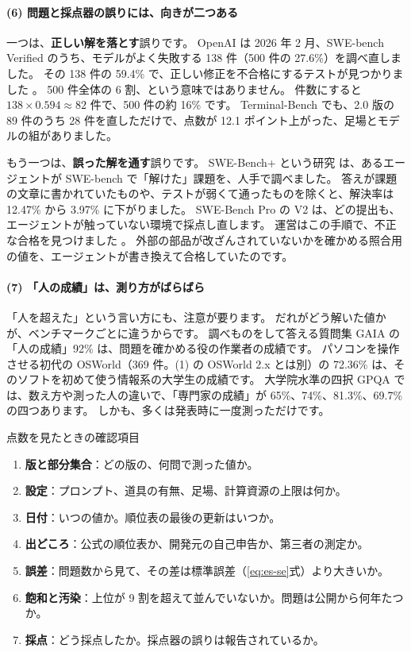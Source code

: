 \paragraph{(6) 問題と採点器の誤りには、向きが二つある}
一つは、\textbf{正しい解を落とす}誤りです。
OpenAI は 2026 年 2 月、SWE-bench Verified のうち、モデルがよく失敗する 138 件（500 件の 27.6\%）を調べ直しました。
その 138 件の 59.4\% で、正しい修正を不合格にするテストが見つかりました \cite{openai2026sweverified}。
500 件全体の 6 割、という意味ではありません。
件数にすると $138 \times 0.594 \approx 82$ 件で、500 件の約 16\% です。
Terminal-Bench でも、2.0 版の 89 件のうち 28 件を直しただけで、点数が 12.1 ポイント上がった、足場とモデルの組がありました。

もう一つは、\textbf{誤った解を通す}誤りです。
SWE-Bench+ という研究 \cite{aleithan2024swebenchplus} は、あるエージェントが SWE-bench で「解けた」課題を、人手で調べました。
答えが課題の文章に書かれていたものや、テストが弱くて通ったものを除くと、解決率は 12.47\% から 3.97\% に下がりました。
SWE-Bench Pro の V2 は、どの提出も、エージェントが触っていない環境で採点し直します。
運営はこの手順で、不正な合格を見つけました \cite{scale2026sweprov2}。
外部の部品が改ざんされていないかを確かめる照合用の値を、エージェントが書き換えて合格していたのです。

\paragraph{(7) 「人の成績」は、測り方がばらばら}
「人を超えた」という言い方にも、注意が要ります。
だれがどう解いた値かが、ベンチマークごとに違うからです。
調べものをして答える質問集 GAIA の「人の成績」92\% は、問題を確かめる役の作業者の成績です。
パソコンを操作させる初代の OSWorld（369 件。(1) の OSWorld 2.x とは別）の 72.36\% は、そのソフトを初めて使う情報系の大学生の成績です。
大学院水準の四択 GPQA では、数え方や測った人の違いで、「専門家の成績」が 65\%、74\%、81.3\%、69.7\% の四つあります。
しかも、多くは発表時に一度測っただけです。

\begin{practice}{点数を見たときの確認項目}
\begin{enumerate}[leftmargin=*,nosep]
  \item \textbf{版と部分集合}：どの版の、何問で測った値か。
  \item \textbf{設定}：プロンプト、道具の有無、足場、計算資源の上限は何か。
  \item \textbf{日付}：いつの値か。順位表の最後の更新はいつか。
  \item \textbf{出どころ}：公式の順位表か、開発元の自己申告か、第三者の測定か。
  \item \textbf{誤差}：問題数から見て、その差は標準誤差（\eqref{eq:es-se}式）より大きいか。
  \item \textbf{飽和と汚染}：上位が 9 割を超えて並んでいないか。問題は公開から何年たつか。
  \item \textbf{採点}：どう採点したか。採点器の誤りは報告されているか。
\end{enumerate}
\end{practice}

